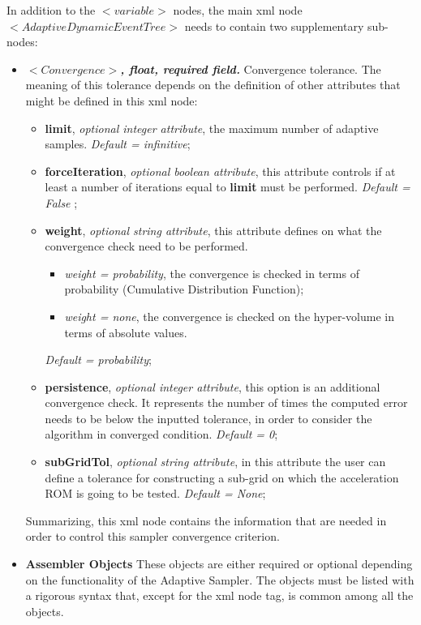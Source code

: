  In addition to the $<variable>$ nodes,  the main xml node $<AdaptiveDynamicEventTree>$ needs to contain two supplementary sub-nodes:
\begin{itemize}
  \item $<Convergence>$\textbf{\textit{, float, required field.}} Convergence tolerance. The meaning of this tolerance depends on the definition of other attributes that might be defined in this xml node:
     \begin{itemize}
         \item \textbf{limit}, \textit{optional integer attribute}, the maximum number of adaptive samples. \textit{Default = infinitive};
         \item \textbf{forceIteration}, \textit{optional boolean attribute}, this attribute controls if at least a number of iterations equal to \textbf{limit} must be performed.  \textit{Default = False} ;
         \item \textbf{weight}, \textit{optional string attribute}, this attribute defines on what the convergence check need to be performed.
          \begin{itemize}
             \item \textit{weight = probability}, the convergence is checked in terms of probability (Cumulative Distribution Function);
             \item \textit{weight = none}, the convergence is checked on the hyper-volume in terms of absolute values.
          \end{itemize} 
          \textit{Default = probability};
         \item \textbf{persistence}, \textit{optional integer attribute}, this option is an additional convergence check. It represents the number of times the computed error needs to be below the inputted tolerance, in order to consider the algorithm in converged condition.  \textit{Default = 0};
         \item \textbf{subGridTol}, \textit{optional string attribute}, in this attribute the user can define a tolerance for constructing a sub-grid on which the acceleration ROM is going to be tested. \textit{Default = None};
      \end{itemize}   
   Summarizing,  this xml node contains the information that are needed in order to control this sampler convergence criterion.
   \item \textbf{Assembler Objects} These objects are either required or optional depending on the functionality of the Adaptive Sampler. The objects must be listed with a rigorous syntax that, except for the xml node tag, is common among all the objects.  

\end{itemize}
